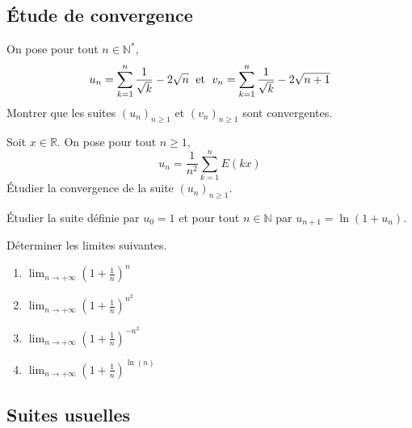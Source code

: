 \documentclass[a4paper,twoside,french,11pt]{VcCours}
\begin{document}

\tableofcontents
\separationTitre

\subsection{Étude de convergence}


\begin{Exercice}
On pose pour tout $n \in \mathbb{N}^*$, 
    \[
    u_n = \sum_{k = 1}^n {\frac{1}{\sqrt k}} - 2\sqrt n \; \hbox{ et } \; v_n = \sum_{k = 1}^n {\frac{1}{\sqrt k}} - 2\sqrt {n + 1}
    \]
 Montrer que les suites $(u_n)_{n \geq 1}$ et $(v_n)_{n \geq 1}$ sont convergentes.
 \end{Exercice}
 
 
 
\begin{Exercice} Soit $x \in \mathbb{R}$. On pose pour tout $n \geq 1$, 
$$u_n = \frac{1}{n^2} \sum_{k=1}^n E(kx)$$
Étudier la convergence de la suite $(u_n)_{n \geq 1}$.
\end{Exercice}



\begin{Exercice} Étudier la suite définie par $u_0=1$ et pour tout $n \in \mathbb{N}$ par $u_{n+1}=\ln(1+u_n)$.
\end{Exercice} 


\begin{Exercice} Déterminer les limites suivantes. 

\begin{multicols}{2}
\begin{enumerate}
\item $\lim_{n \rightarrow + \infty} \left(1+ \frac{1}{n}\right)^n$
\item $\lim_{n \rightarrow + \infty} \left(1+ \frac{1}{n}\right)^{n^2}$
\columnbreak
\item $\lim_{n \rightarrow + \infty} \left(1+ \frac{1}{n}\right)^{-n^2}$
\item $\lim_{n \rightarrow + \infty} \left(1+ \frac{1}{n}\right)^{\ln(n)}$
\end{enumerate}
\end{multicols}
\end{Exercice} 



\subsection{Suites usuelles}
\end{document}
